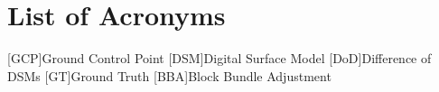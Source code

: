 
\chapter*{List of Acronyms}



\begin{acronym}
	[GCP]{Ground Control Point}
	[DSM]{Digital Surface Model}
	[DoD]{Difference of DSMs}
	[GT]{Ground Truth}
	[BBA]{Block Bundle Adjustment}
\end{acronym}

%
%

